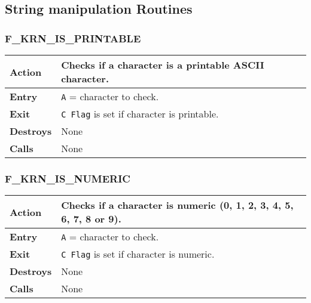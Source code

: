 \subsection{String manipulation Routines}

    \subsubsection{F\_KRN\_IS\_PRINTABLE}
    \label{func:fkrnisprintable}
    \begin{tabular}{l p{9cm}}
        \hline\textbf{Action}
        & Checks if a character is a printable ASCII character.\\
        \hline\textbf{Entry} & \texttt{A} = character to check.\\
        \hline\textbf{Exit} & \texttt{C Flag} is set if character is printable.\\
        \hline\textbf{Destroys} & None\\
        \hline\textbf{Calls} & None\\
        \hline
    \end{tabular}

    \subsubsection{F\_KRN\_IS\_NUMERIC}
    \label{func:fkrnisnumeric}
    \begin{tabular}{l p{9cm}}
        \hline\textbf{Action}
        & Checks if a character is numeric (0, 1, 2, 3, 4, 5, 6, 7, 8 or 9).\\
        \hline\textbf{Entry} & \texttt{A} = character to check.\\
        \hline\textbf{Exit} & \texttt{C Flag} is set if character is numeric.\\
        \hline\textbf{Destroys} & None\\
        \hline\textbf{Calls} & None\\
        \hline
    \end{tabular}

